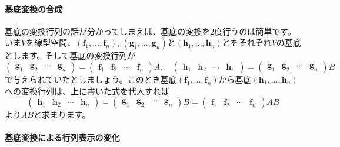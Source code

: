 \paragraph{基底変換の合成} 基底の変換行列の話が分かってしまえば、基底の変換を$2$度行うのは簡単です。いま$V$を線型空間、$(\bm{f}_1, \ldots, \bm{f}_n)$, $(\bm{g}_1, \ldots, \bm{g}_n)$と$(\bm{h}_1, \ldots, \bm{h}_n)$とをそれぞれ$V$の基底とします。そして基底の変換行列が
\[
\begin{pmatrix}
\bm{g}_1 & \bm{g}_2 & \cdots & \bm{g}_n
\end{pmatrix}
=
\begin{pmatrix}
\bm{f}_1 & \bm{f}_2 & \cdots & \bm{f}_n
\end{pmatrix} A, \quad
\begin{pmatrix}
\bm{h}_1 & \bm{h}_2 & \cdots & \bm{h}_n
\end{pmatrix}
=
\begin{pmatrix}
\bm{g}_1 & \bm{g}_2 & \cdots & \bm{g}_n
\end{pmatrix} B
\]
で与えられていたとしましょう。このとき基底$(\bm{f}_1, \ldots, \bm{f}_n)$から基底$(\bm{h}_1, \ldots, \bm{h}_n)$への変換行列は、上に書いた式を代入すれば
\[
\begin{pmatrix}
\bm{h}_1 & \bm{h}_2 & \cdots & \bm{h}_n
\end{pmatrix}
=
\begin{pmatrix}
\bm{g}_1 & \bm{g}_2 & \cdots & \bm{g}_n
\end{pmatrix} B
=
\begin{pmatrix}
\bm{f}_1 & \bm{f}_2 & \cdots & \bm{f}_n
\end{pmatrix} AB
\]
より$AB$と求まります。

\paragraph{基底変換による行列表示の変化}

